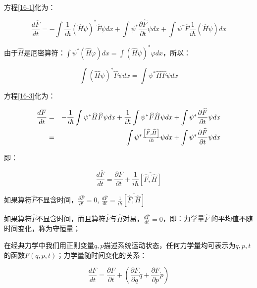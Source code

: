 方程\ref{16-1}化为：

\begin{equation}\label{16-3}
\frac{{d\overline F }}{{dt}} =  - \int {\frac{1}{{i\hbar }}\left( {\widehat H\psi } \right)} ^* \widehat F\psi dx + \int {\psi ^* \frac{{\partial \widehat F}}{{\partial t}}\psi dx}  + \int {\psi ^* \widehat F\frac{1}{{i\hbar }}\left( {\widehat H\psi } \right)dx}
\end{equation}

由于$\hat H$是厄密算符：$\int {\psi ^* \left( {\widehat H\varphi } \right)dx}  = \int {\left( {\widehat H\psi } \right)} ^* \varphi dx$，所以：

\begin{equation*}
\int {\left( {\widehat H\psi } \right)} ^* \widehat F\psi dx = \int {\psi ^* \widehat H\widehat F\psi dx} 
\end{equation*}

方程\ref{16-3}化为：

\begin{eqnarray*}
\frac{{d\overline F }}{{dt}} & = &  - \frac{1}{{i\hbar }}\int \psi  ^* \widehat H\widehat F\psi dx + \frac{1}{{i\hbar }}\int {\psi ^* \widehat F\widehat H\psi dx}  + \int {\psi ^* \frac{{\partial \widehat F}}{{\partial t}}\psi dx} \\
{}& = & \int {\psi ^* {\textstyle{{\left[ {\widehat F,\widehat H} \right]} \over {i\hbar }}}\psi dx}  + \int {\psi ^* \frac{{\partial \widehat F}}{{\partial t}}\psi dx} 
\end{eqnarray*}

即：

\begin{equation}\label{16-4}
\frac{{d\overline F }}{{dt}} = \overline {\frac{{\partial F}}{{\partial t}}}  + \frac{1}{{i\hbar }}\overline {\left[ {\widehat F,\widehat H} \right]}
\end{equation}

如果算符$\hat F$不显含时间，$\frac{{\partial \widehat F}}{{\partial t}} = 0$, $\frac{{d\overline F }}{{dt}} = \frac{1}{{i\hbar }}\overline {\left[ {\widehat F,\widehat H} \right]} $


如果算符$\hat F$不显含时间，而且算符$\hat F$与$\hat H$对易，$\frac{{d\overline F }}{{dt}} = 0$，即：力学量$\hat F$ 的平均值不随时间变化，称为守恒量；

在经典力学中我们用正则变量$q,p$描述系统运动状态，任何力学量均可表示为$q,p,t$的函数$F(q,p,t)$；力学量随时间变化的关系：


\begin{equation}\label{16-5}
\frac{{dF}}{{dt}} = \frac{{\partial F}}{{\partial t}} + \left( {\frac{{\partial F}}{{\partial q}}\dot q + \frac{{\partial F}}{{\partial p}}\dot p} \right)
\end{equation}


